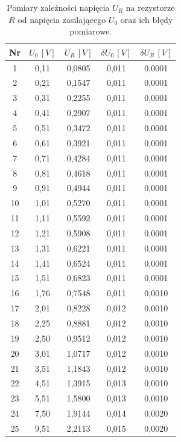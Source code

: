 \documentclass[12pt]{article}
\begin{document}
\begin{table}[H]
    \centering
    \begin{tabular}{c|cccc}
        \toprule
        Nr & $U_0 \,[V]$ & $U_R \,[V]$ & $\delta U_0 \,[V]$ & $\delta U_R \,[V]$ \\
        \midrule
        1  & 0{,}11  & 0{,}0805 & 0{,}011 & 0{,}0001  \\
        2  & 0{,}21  & 0{,}1547 & 0{,}011 & 0{,}0001  \\
        3  & 0{,}31  & 0{,}2255 & 0{,}011 & 0{,}0001  \\
        4  & 0{,}41  & 0{,}2907 & 0{,}011 & 0{,}0001  \\
        5  & 0{,}51  & 0{,}3472 & 0{,}011 & 0{,}0001  \\
        6  & 0{,}61  & 0{,}3921 & 0{,}011 & 0{,}0001  \\
        7  & 0{,}71  & 0{,}4284 & 0{,}011 & 0{,}0001  \\
        8  & 0{,}81  & 0{,}4618 & 0{,}011 & 0{,}0001  \\
        9  & 0{,}91  & 0{,}4944 & 0{,}011 & 0{,}0001  \\
        10 & 1{,}01  & 0{,}5270 & 0{,}011 & 0{,}0001  \\
        11 & 1{,}11  & 0{,}5592 & 0{,}011 & 0{,}0001  \\
        12 & 1{,}21  & 0{,}5908 & 0{,}011 & 0{,}0001  \\
        13 & 1{,}31  & 0{,}6221 & 0{,}011 & 0{,}0001  \\
        14 & 1{,}41  & 0{,}6524 & 0{,}011 & 0{,}0001  \\
        15 & 1{,}51  & 0{,}6823 & 0{,}011 & 0{,}0001  \\
        16 & 1{,}76  & 0{,}7548 & 0{,}011 & 0{,}0010  \\
        17 & 2{,}01  & 0{,}8228 & 0{,}012 & 0{,}0010  \\
        18 & 2{,}25  & 0{,}8881 & 0{,}012 & 0{,}0010  \\
        19 & 2{,}50  & 0{,}9512 & 0{,}012 & 0{,}0010  \\
        20 & 3{,}01  & 1{,}0717 & 0{,}012 & 0{,}0010  \\
        21 & 3{,}51  & 1{,}1843 & 0{,}012 & 0{,}0010  \\
        22 & 4{,}51  & 1{,}3915 & 0{,}013 & 0{,}0010  \\
        23 & 5{,}51  & 1{,}5800 & 0{,}013 & 0{,}0010  \\
        24 & 7{,}50  & 1{,}9144 & 0{,}014 & 0{,}0020  \\
        25 & 9{,}51  & 2{,}2113 & 0{,}015 & 0{,}0020  \\
        \bottomrule
    \end{tabular}
    \caption{Pomiary zależności napięcia $U_R$ na rezystorze $R$ od napięcia zasilającego $U_0$ oraz ich błędy pomiarowe.}
    \label{tab:resistor_voltage}
\end{table}
\end{document}
